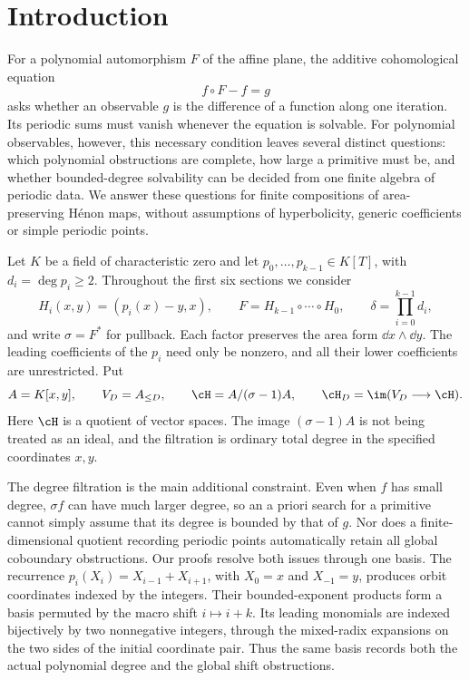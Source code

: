 \section{Introduction}
\label{sec:introduction}

For a polynomial automorphism $F$ of the affine plane, the additive
cohomological equation
\begin{equation}
  f\circ F-f=g
  \label{eq:cohomological-equation}
\end{equation}
asks whether an observable $g$ is the difference of a function along one
iteration. Its periodic sums must vanish whenever the equation is solvable.
For polynomial observables, however, this necessary condition leaves several
distinct questions: which polynomial obstructions are complete, how large a
primitive must be, and whether bounded-degree solvability can be decided from
one finite algebra of periodic data. We answer these questions for finite
compositions of area-preserving H\'enon maps, without assumptions of
hyperbolicity, generic coefficients or simple periodic points.

Let $K$ be a field of characteristic zero and let
$p_0,\ldots,p_{k-1}\in K[T]$, with $d_i=\deg p_i\ge2$. Throughout the first
six sections we consider
\begin{equation}
  H_i(x,y)=(p_i(x)-y,x),\qquad
  F=H_{k-1}\circ\cdots\circ H_0,\qquad
  \delta=\prod_{i=0}^{k-1}d_i,
  \label{eq:intro-map}
\end{equation}
and write $\sigma=F^*$ for pullback. Each factor preserves the area form
$\dd x\wedge\dd y$. The leading coefficients of the $p_i$ need only be
nonzero, and all their lower coefficients are unrestricted. Put
\begin{equation}
  A=K[x,y],\qquad V_D=A_{\le D},\qquad
  \cH=A/(\sigma-1)A,\qquad
  \cH_D=\im(V_D\longrightarrow\cH).
  \label{eq:intro-filtration}
\end{equation}
Here $\cH$ is a quotient of vector spaces. The image $(\sigma-1)A$ is not
being treated as an ideal, and the filtration is ordinary total degree in the
specified coordinates $x,y$.

The degree filtration is the main additional constraint. Even when $f$ has
small degree, $\sigma f$ can have much larger degree, so an a priori search
for a primitive cannot simply assume that its degree is bounded by that of
$g$. Nor does a finite-dimensional quotient recording periodic points
automatically retain all global coboundary obstructions. Our proofs resolve
both issues through one basis. The recurrence
$p_i(X_i)=X_{i-1}+X_{i+1}$, with $X_0=x$ and $X_{-1}=y$, produces orbit
coordinates indexed by the integers. Their bounded-exponent products form
a basis permuted by the macro shift $i\mapsto i+k$. Its leading monomials
are indexed bijectively by two nonnegative integers, through the mixed-radix
expansions on the two sides of the initial coordinate pair. Thus the same
basis records both the actual polynomial degree and the global shift
obstructions.

